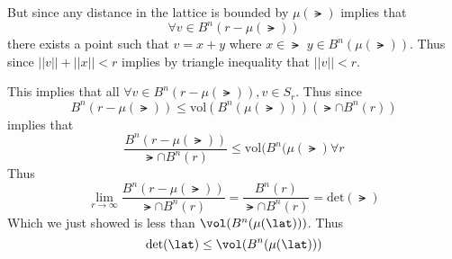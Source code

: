 \documentclass[12pt]{amsart}
\begin{document}
\begin{problem}
\begin{subproblem}
      But since any distance in the lattice is bounded by $\mu(\lat)$ implies that 
      \[\forall v\in B^n(r-\mu(\lat))\]
      there exists a point such that $v=x+y$ where $x\in \lat$ $y\in B^n(\mu(\lat))$. Thus since $||v|| +||x|| <r$ implies by triangle inequality that $||v|| < r$.

      This implies that all $\forall v\in B^n(r-\mu(\lat)), v\in S_r$. Thus since 
      \[B^n(r-\mu(\lat)) \leq \text{vol}(B^n(\mu(\lat))) (\lat\cap B^n(r))\]
      implies that 
      \[\frac{B^n(r-\mu(
\lat
))}{\lat \cap B^n(r)}\leq \text{vol}(B^n(\mu(\lat)\forall r\]
      Thus 
      \[\lim_{r\to\infty}\frac{B^n(r-\mu(\lat))}{\lat\cap B^n(r)} = \frac{B^n(r)}{\lat \cap B^n(r)} = \text{det}(\lat)\]
      Which we just showed is less than $\vol (B^n(\mu(\lat)))$. Thus 
      \[\text{det}(\lat) \leq \vol (B^n(\mu(\lat)))\]
      
    \end{subproblem}



\end{problem}
\end{document}
